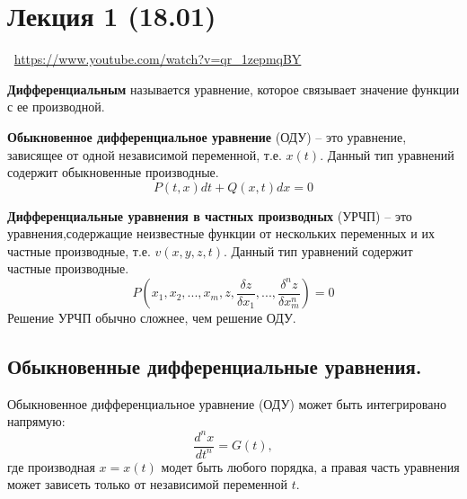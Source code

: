 \section{Лекция 1 (18.01)}

\large \faYoutube \normalsize $\>$ \url{https://www.youtube.com/watch?v=qr_1zepmqBY}

\begin{definition}
    \textbf{Дифференциальным} называется уравнение, которое связывает значение функции с ее производной.
\end{definition}

\begin{definition}
    \textbf{Обыкновенное дифференциальное уравнение} (ОДУ) -- это уравнение, зависящее от одной независимой переменной, т.е. $x(t)$. Данный тип уравнений содержит обыкновенные производные.
    \[
        P(t,x) dt + Q(x,t) dx = 0
    \]
\end{definition}

\begin{definition}
    \textbf{Дифференциальные уравнения в частных производных} (УРЧП) -- это уравнения,содержащие неизвестные функции от нескольких переменных и их частные производные, т.е. $v(x,y,z,t)$. Данный тип уравнений содержит частные производные.
    \[
        P(x_1, x_2, ..., x_m, z, \frac{\delta z}{\delta x_1}, ..., \frac{\delta^n z}{\delta x_m^n}) = 0
    \]
    Решение УРЧП обычно сложнее, чем решение ОДУ.
\end{definition}

\subsection{Обыкновенные дифференциальные уравнения.}

Обыкновенное дифференциальное уравнение (ОДУ) может быть интегрировано напрямую:
\[
    \frac{d^n x}{d t^n} = G(t),
\]
где производная $x = x(t)$ модет быть любого порядка, а правая часть уравнения может зависеть только от независимой переменной $t$.